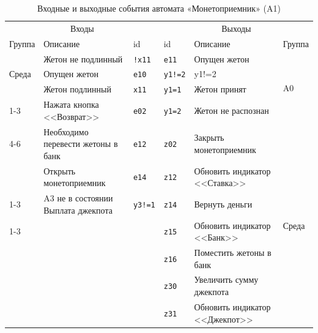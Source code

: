 \begin{table}[H]
\centering
\caption{Входные и выходные события автомата «Монетоприемник» (A1)}
\small
\begin{tabular}{@{}p{1.3cm}p{4.6cm}l|lp{4.6cm}p{1.3cm}@{}}
\toprule
\multicolumn{3}{c}{Входы} & \multicolumn{3}{c}{Выходы} \\
Группа & Описание & id & id & Описание & Группа \\
\midrule
\multirow{3}{*}{Среда} & Жетон не подлинный & \texttt{!x11} & \texttt{e11} & Опущен жетон & \multirow{4}{*}{A0} \\
 & Опущен жетон & \texttt{e10} & \texttt{y1!=2} & y1!=2 &  \\
 & Жетон подлинный & \texttt{x11} & \texttt{y1=1} & Жетон принят &  \\
\cline{1-3}
\multirow{3}{*}{A0} & Нажата кнопка <<Возврат>> & \texttt{e02} & \texttt{y1=2} & Жетон не распознан &  \\
\cline{4-6}
 & Необходимо перевести жетоны в банк & \texttt{e12} & \texttt{z02} & Закрыть монетоприемник & \multirow{7}{*}{Среда} \\
 & Открыть монетоприемник & \texttt{e14} & \texttt{z12} & Обновить индикатор <<Ставка>> &  \\
\cline{1-3}
\multirow{1}{*}{A3} & A3 не в состоянии Выплата джекпота & \texttt{y3!=1} & \texttt{z14} & Вернуть деньги &  \\
\cline{1-3}
 &  &  & \texttt{z15} & Обновить индикатор <<Банк>> &  \\
 &  &  & \texttt{z16} & Поместить жетоны в банк &  \\
 &  &  & \texttt{z30} & Увеличить сумму джекпота &  \\
 &  &  & \texttt{z31} & Обновить индикатор <<Джекпот>> &  \\
\bottomrule
\end{tabular}
\end{table}